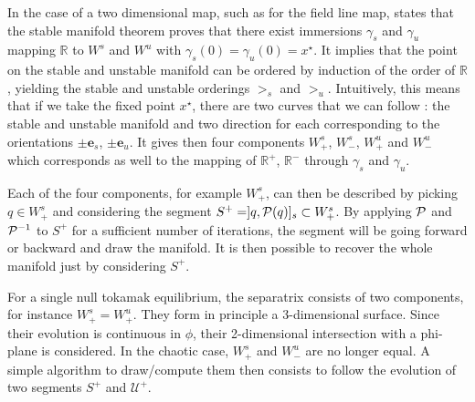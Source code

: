 In the case of a two dimensional map, such as for the field line map, \cite{easton_trellises_1986} states that the stable manifold theorem proves that there exist immersions $\gamma_s$ and $\gamma_u$ mapping $\mathbb{R}$ to $W^s$ and $W^u$ with $\gamma_s(0) = \gamma_u(0) = x^\star$. It implies that the point on the stable and unstable manifold can be ordered by induction of the order of $\mathbb{R}$, yielding the stable and unstable orderings $>_s$ and $>_u$. Intuitively, this means that if we take the fixed point $x^\star$, there are two curves that we can follow : the stable and unstable manifold and two direction for each corresponding to the orientations $\pm\textbf{e}_s$, $\pm\textbf{e}_u$. It gives then four components $W_+^s$, $W_-^s$, $W_+^u$ and $W_-^u$ which corresponds as well to the mapping of $\mathbb{R}^+$, $\mathbb{R}^-$ through $\gamma_s$ and $\gamma_u$.

Each of the four components, for example $W^s_+$, can then be described by picking $q \in W^s_+$ and considering the segment $S^+ = ]q,\mathcal{P}(q)]_s \subset W^s_+$. By applying $\mathcal{P}$ and $\mathcal{P}^{-1}$ to $S^+$ for a sufficient number of iterations, the segment will be going forward or backward and draw the manifold. It is then possible to recover the whole manifold just by considering $S^+$.

For a single null tokamak equilibrium, the separatrix consists of two components, for instance $W^s_+ = W^u_+$. They form in principle a 3-dimensional surface. Since their evolution is continuous in $\phi$, their 2-dimensional intersection with a phi-plane is considered. In the chaotic case, $W^s_+$ and $W^u_-$ are no longer equal. A simple algorithm to draw/compute them then consists to follow the evolution of two segments $S^+$ and $\mathcal{U}^+$.

